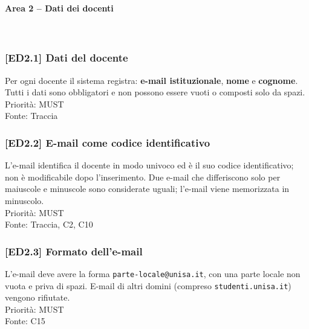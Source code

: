 \paragraph{Area 2 – Dati dei docenti}~\\
\subsubsection{[ED2.1] Dati del docente}
Per ogni docente il sistema registra: \textbf{e-mail istituzionale}, \textbf{nome} e \textbf{cognome}. Tutti i dati sono obbligatori e non possono essere vuoti o composti solo da spazi.\\
Priorità: MUST\\Fonte: Traccia

\subsubsection{[ED2.2] E-mail come codice identificativo}
L'e-mail identifica il docente in modo univoco ed è il suo codice identificativo; non è modificabile dopo l'inserimento. Due e-mail che differiscono solo per maiuscole e minuscole sono considerate uguali; l'e-mail viene memorizzata in minuscolo.\\
Priorità: MUST\\Fonte: Traccia, C2, C10

\subsubsection{[ED2.3] Formato dell'e-mail}
L'e-mail deve avere la forma \texttt{parte-locale@unisa.it}, con una parte locale non vuota e priva di spazi. E-mail di altri domini (compreso \texttt{studenti.unisa.it}) vengono rifiutate.\\
Priorità: MUST\\Fonte: C15
